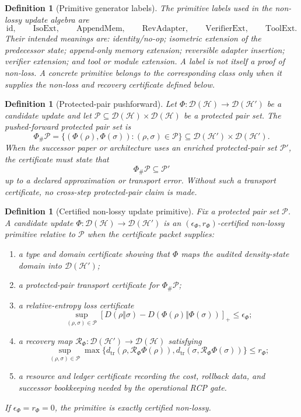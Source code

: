 \documentclass[11pt]{article}
\newtheorem{definition}[theorem]{Definition}
\newcommand{\D}{\mathcal{D}}
\newcommand{\Hcal}{\mathcal{H}}
\newcommand{\Pcal}{\mathcal{P}}
\newcommand{\Rcal}{\mathcal{R}}
\newcommand{\1}{\mathbf{1}}
\begin{document}
\begin{definition}[Primitive generator labels]
\label{def:nl_primitive_generator_labels}
The primitive labels used in the non-lossy update algebra are
\[
\mathrm{id},\qquad
\mathrm{IsoExt},\qquad
\mathrm{AppendMem},\qquad
\mathrm{RevAdapter},\qquad
\mathrm{VerifierExt},\qquad
\mathrm{ToolExt}.
\]
Their intended meanings are: identity/no-op; isometric extension of the predecessor state; append-only memory extension; reversible adapter insertion; verifier extension; and tool or module extension.  A label is not itself a proof of non-loss.  A concrete primitive belongs to the corresponding class only when it supplies the non-loss and recovery certificate defined below.
\end{definition}

\begin{definition}[Protected-pair pushforward]
\label{def:protected_pair_pushforward}
Let \(\Phi:\D(\Hcal)\to\D(\Hcal')\) be a candidate update and let \(\Pcal\subseteq\D(\Hcal)\times\D(\Hcal)\) be a protected pair set.  The pushed-forward protected pair set is
\[
\Phi_\#\Pcal
=
\{(\Phi(\rho),\Phi(\sigma)):(\rho,\sigma)\in\Pcal\}
\subseteq\D(\Hcal')\times\D(\Hcal').
\]
When the successor paper or architecture uses an enriched protected-pair set \(\Pcal'\), the certificate must state that
\[
\Phi_\#\Pcal\subseteq \Pcal'
\]
up to a declared approximation or transport error.  Without such a transport certificate, no cross-step protected-pair claim is made.
\end{definition}

\begin{definition}[Certified non-lossy update primitive]
\label{def:certified_nl_update_primitive}
Fix a protected pair set \(\Pcal\).  A candidate update \(\Phi:\D(\Hcal)\to\D(\Hcal')\) is an \((\epsilon_\Phi,r_\Phi)\)-certified non-lossy primitive relative to \(\Pcal\) when the certificate packet supplies:
\begin{enumerate}[label=(\roman*),leftmargin=1.5em]
    \item a type and domain certificate showing that \(\Phi\) maps the audited density-state domain into \(\D(\Hcal')\);
    \item a protected-pair transport certificate for \(\Phi_\#\Pcal\);
    \item a relative-entropy loss certificate
    \[
    \sup_{(\rho,\sigma)\in\Pcal}
    \left[D(\rho\Vert\sigma)-D(\Phi(\rho)\Vert\Phi(\sigma))\right]_+
    \le \epsilon_\Phi;
    \]
    \item a recovery map \(\Rcal_\Phi:\D(\Hcal')\to\D(\Hcal)\) satisfying
    \[
    \sup_{(\rho,\sigma)\in\Pcal}
    \max\{d_{\mathrm{tr}}(\rho,\Rcal_\Phi\Phi(\rho)),
    d_{\mathrm{tr}}(\sigma,\Rcal_\Phi\Phi(\sigma))\}
    \le r_\Phi;
    \]
    \item a resource and ledger certificate recording the cost, rollback data, and successor bookkeeping needed by the operational RCP gate.
\end{enumerate}
If \(\epsilon_\Phi=r_\Phi=0\), the primitive is exactly certified non-lossy.
\end{definition}
\end{document}
